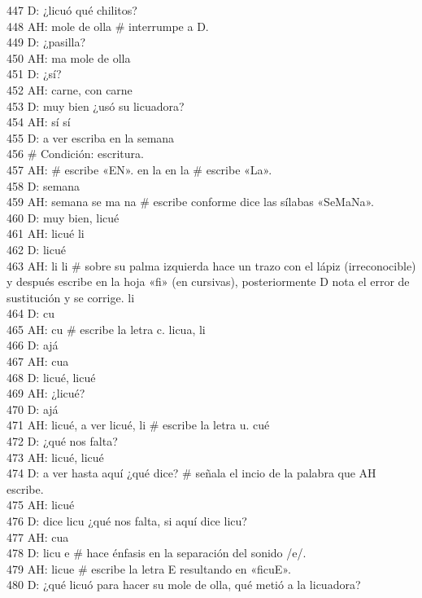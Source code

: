 447 D: ¿licuó qué chilitos?\\
448 AH: mole de olla \# interrumpe a D.\\
449 D: ¿pasilla?\\
450 AH: ma mole de olla\\
451 D: ¿sí?\\
452 AH: carne, con carne\\
453 D: muy bien ¿usó su licuadora?\\
454 AH: sí sí\\
455 D: a ver escriba en la semana\\
456 \# Condición: escritura.\\
457 AH: \# escribe «EN». en la en la \# escribe «La».\\
458 D: semana\\
459 AH: semana se ma na \# escribe conforme dice las sílabas «SeMaNa».\\
460 D: muy bien, licué\\
461 AH: licué li\\
462 D: licué\\
463 AH: li li \# sobre su palma izquierda hace un trazo con el lápiz (irreconocible) y después escribe en la hoja «fi» (en cursivas), posteriormente D nota el error de sustitución y se corrige. li\\
464 D: cu\\
465 AH: cu \# escribe la letra c. licua, li\\
466 D: ajá\\
467 AH: cua\\
468 D: licué, licué\\
469 AH: ¿licué?\\
470 D: ajá\\
471 AH: licué, a ver licué, li \# escribe la letra u. cué\\
472 D: ¿qué nos falta?\\
473 AH: licué, licué\\
474 D: a ver hasta aquí ¿qué dice? \# señala el incio de la palabra que AH escribe.\\
475 AH: licué\\
476 D: dice licu ¿qué nos falta, si aquí dice licu?\\
477 AH: cua\\
478 D: licu e \# hace énfasis en la separación del sonido /e/.\\
479 AH: licue \# escribe la letra E resultando en «ficuE».\\
480 D: ¿qué licuó para hacer su mole de olla, qué metió a la licuadora?\\
